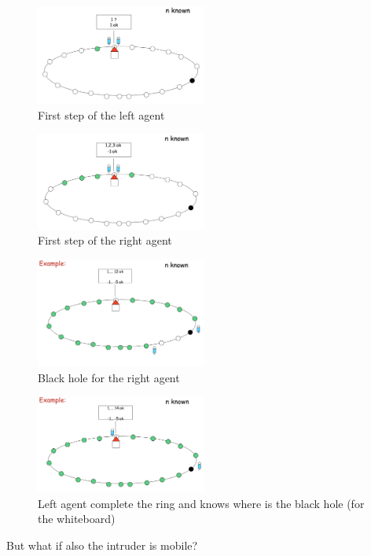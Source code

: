 \documentclass[paper=a4, fontsize=11pt]{scrartcl} %
\numberwithin{equation}{section} %
\numberwithin{figure}{section} %
\numberwithin{table}{section} %
\begin{document}
 \begin{figure}[H]
  \centering
  \includegraphics[width=0.5\textwidth]{img/ring1.png}
  \caption{First step of the left agent}
  \label{fig:boat1}
\end{figure} \begin{figure}[H]
  \centering
  \includegraphics[width=0.5\textwidth]{img/ring2.png}
  \caption{First step of the right agent}
  \label{fig:boat1}
\end{figure} \begin{figure}[H]
  \centering
  \includegraphics[width=0.5\textwidth]{img/ring3.png}
  \caption{Black hole for the right agent}
  \label{fig:boat1}
\end{figure} \begin{figure}[H]
  \centering
  \includegraphics[width=0.5\textwidth]{img/ring4.png}
  \caption{Left agent complete the ring and knows where is the black hole (for the whiteboard)}
  \label{fig:boat1}
\end{figure}
But what if also the intruder is mobile? \\
\end{document}
